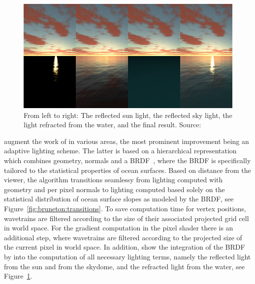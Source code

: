 %
%
\begin{figure}
 \centering
 \includegraphics[scale=0.25]{figures/Seamless_Ocean_Lighting_-_Bruneton_2010-002.png}
 \caption{From left to right: The reflected sun light, the reflected sky light,
 the light refracted from the water, and the final result.
 Source:~\cite{article:oceanlighting}}
\label{fig:bruneton:lightingterms}
\end{figure}
%
%

\citet{article:oceanlighting} augment the work of \citeauthor{Hinsinger:2002} in
various areas, the most prominent improvement being an adaptive lighting scheme.
The latter is based on a hierarchical representation which combines geometry,
normals and a BRDF~\citep{Ross:2005}, where the BRDF is specifically tailored to
the statistical properties of ocean surfaces. Based on distance from the viewer,
the algorithm transitions seamlessy from lighting computed with geometry and per
pixel normals to lighting computed based solely on the statistical distribution
of ocean surface slopes as modeled by the BRDF, see Figure~\ref{fig:bruneton:transitions}.
To save computation time for vertex positions, wavetrains are filtered according
to the size of their associated projected grid cell in world space.
For the gradient computation in the pixel shader there is an additional step,
where wavetrains are filtered according to the projected size of the current pixel
in world space. In addition, \citeauthor{article:oceanlighting} show the
integration of the BRDF by \citeauthor{Ross:2005} into the computation of
all necessary lighting terms, namely the reflected light from the sun and from
the skydome, and the refracted light from the water, see
Figure~\ref{fig:bruneton:lightingterms}.
 
